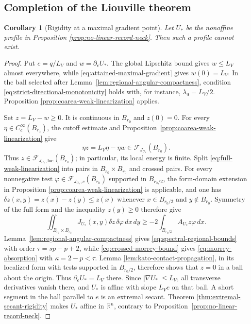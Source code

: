 \documentclass[11pt,reqno]{amsart}
\numberwithin{equation}{section}
\newcommand{\R}{\mathbb R}
\newcommand{\dd}{\,d}
\newtheorem{corollary}[theorem]{Corollary}
\theoremstyle{remark}
\begin{document}
\subsection{Completion of the Liouville theorem}
\label{subsec:liouville-completion}

\begin{corollary}[Rigidity at a maximal gradient point]
\label{cor:gradient-contact-bernstein}
Let $U_*$ be the nonaffine profile in Proposition
\ref{prop:no-linear-record-neck}.  Then such a profile cannot exist.
\end{corollary}

\begin{proof}
Put $e=q/L_V$ and $w=\partial_eU_*$.  The global Lipschitz bound gives
$w\le L_V$ almost everywhere, while
\eqref{eq:attained-maximal-gradient} gives $w(0)=L_V$.  In the ball
selected after Lemma~\ref{lem:regional-angular-compactness}, condition
\eqref{eq:strict-directional-monotonicity} holds with, for instance,
$\lambda_0=L_V/2$.  Proposition
\ref{prop:coarea-weak-linearization} applies.

Set $z=L_V-w\ge0$.  It is continuous in $B_{r_0}$ and $z(0)=0$.
For every \(\eta\in C_c^\infty(B_{r_0})\), the cutoff estimate and
Proposition~\ref{prop:coarea-weak-linearization} give
\[
 \eta z=L_V\eta-\eta w\in\mathcal F_{J_{U_*}}(B_{r_0}).
\]
Thus \(z\in\mathcal F_{J_{U_*},\mathrm{loc}}(B_{r_0})\); in
particular, its local energy is finite.  Split
\eqref{eq:full-weak-linearization} into pairs in
$B_{r_0}\times B_{r_0}$ and crossed pairs.  For every nonnegative test
\(\varphi\in\mathcal F_{J_{U_*},c}(B_{r_0})\) supported in
$B_{r_0/2}$, the form-domain extension in Proposition
\ref{prop:coarea-weak-linearization} is applicable, and one has
\(\delta z(x,y)=z(x)-z(y)\le z(x)\) whenever
\(x\in B_{r_0/2}\) and \(y\notin B_{r_0}\).  Symmetry of the full form
and the inequality \(z(y)\ge0\) therefore give
\[
 \iint_{B_{r_0}\times B_{r_0}}
 J_{U_*}(x,y)\delta z\,\delta\varphi\dd x\!\dd y
 \ge-2\int_{B_{r_0/2}}A_{U_*}z\varphi\dd x.
\]
Lemma~\ref{lem:regional-angular-compactness} gives
\eqref{eq:spectral-regional-bounds} with order $\tau=sp-p+2$, while
\eqref{eq:crossed-morrey-bound} gives
\eqref{eq:morrey-absorption} with $\kappa=2-p<\tau$.  Lemma
\ref{lem:kato-contact-propagation}, in its localized form with tests
supported in \(B_{r_0/2}\), therefore shows that $z=0$ in a ball about
the origin.  Thus $\partial_eU_*=L_V$ there.  Since
$|\nabla U_*|\le L_V$, all transverse derivatives vanish there, and
$U_*$ is affine with slope $L_Ve$ on that ball.  A short segment in the
ball parallel to $e$ is an extremal secant.  Theorem
\ref{thm:extremal-secant-rigidity} makes $U_*$ affine in $\R^n$, contrary
to Proposition~\ref{prop:no-linear-record-neck}.
\end{proof}
\end{document}
